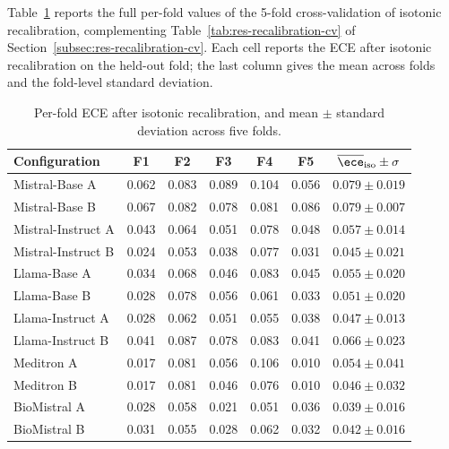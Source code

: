 Table~\ref{tab:app-recalibration-cv-detail} reports the full per-fold 
values of the 5-fold cross-validation of isotonic recalibration, 
complementing Table~\ref{tab:res-recalibration-cv} of 
Section~\ref{subsec:res-recalibration-cv}. Each cell reports the ECE 
after isotonic recalibration on the held-out fold; the last column 
gives the mean across folds and the fold-level standard deviation.

\begin{table}[htbp]
    \centering
    \caption{Per-fold ECE after isotonic recalibration, and mean 
        $\pm$ standard deviation across five folds.}
    \label{tab:app-recalibration-cv-detail}
    \small
    \begin{tabular}{@{}lcccccc@{}}
        \toprule
        \textbf{Configuration} & 
        \textbf{F1} & \textbf{F2} & \textbf{F3} & \textbf{F4} & \textbf{F5} & 
        \boldmath$\overline{\ece}_{\text{iso}} \pm \sigma$ \\
        \midrule
        Mistral-Base A     & 0.062 & 0.083 & 0.089 & 0.104 & 0.056 & $0.079 \pm 0.019$ \\
        Mistral-Base B     & 0.067 & 0.082 & 0.078 & 0.081 & 0.086 & $0.079 \pm 0.007$ \\
        Mistral-Instruct A & 0.043 & 0.064 & 0.051 & 0.078 & 0.048 & $0.057 \pm 0.014$ \\
        Mistral-Instruct B & 0.024 & 0.053 & 0.038 & 0.077 & 0.031 & $0.045 \pm 0.021$ \\
        Llama-Base A       & 0.034 & 0.068 & 0.046 & 0.083 & 0.045 & $0.055 \pm 0.020$ \\
        Llama-Base B       & 0.028 & 0.078 & 0.056 & 0.061 & 0.033 & $0.051 \pm 0.020$ \\
        Llama-Instruct A   & 0.028 & 0.062 & 0.051 & 0.055 & 0.038 & $0.047 \pm 0.013$ \\
        Llama-Instruct B   & 0.041 & 0.087 & 0.078 & 0.083 & 0.041 & $0.066 \pm 0.023$ \\
        Meditron A         & 0.017 & 0.081 & 0.056 & 0.106 & 0.010 & $0.054 \pm 0.041$ \\
        Meditron B         & 0.017 & 0.081 & 0.046 & 0.076 & 0.010 & $0.046 \pm 0.032$ \\
        BioMistral A       & 0.028 & 0.058 & 0.021 & 0.051 & 0.036 & $0.039 \pm 0.016$ \\
        BioMistral B       & 0.031 & 0.055 & 0.028 & 0.062 & 0.032 & $0.042 \pm 0.016$ \\
        \bottomrule
    \end{tabular}
\end{table}

